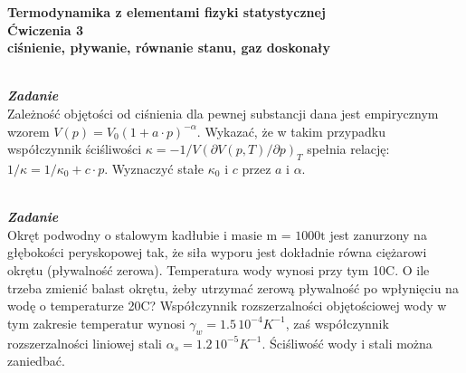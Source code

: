 \documentclass[11pt,a4paper]{article}
\newcounter{zadanie}\newcommand{\zadanie}[1][]{\addtocounter{zadanie}{1} ~\\  {\bf \emph{Zadanie \arabic{zadanie} #1 }} \\}
\begin{document}
\vspace*{-1.8cm}

\begin{centering}
\bf{\Large{Termodynamika z elementami fizyki statystycznej}}\\
Ćwiczenia 3 \\[1mm]
ciśnienie, pływanie, równanie stanu, gaz doskonały \\
\end{centering}

\zadanie
Zależność objętości od ciśnienia dla pewnej substancji dana jest empirycznym wzorem $V(p) = V_0(1 + a\cdot p)^{-\alpha}$.
Wykazać, że w takim przypadku współczynnik ściśliwości $\kappa=-1/V(\partial V(p,T)/\partial p)_T$ spełnia relację: $1/\kappa=1/\kappa_0+c\cdot p$.
Wyznaczyć stałe $\kappa_0$ i $c$ przez $a$ i $\alpha$.

\zadanie
Okręt podwodny o stalowym kadłubie i masie m = $1000\textrm{t}$ jest zanurzony na głębokości peryskopowej tak, że siła wyporu jest dokładnie równa ciężarowi okrętu (pływalność zerowa). Temperatura wody wynosi przy tym 10\degree C. O ile trzeba zmienić balast okrętu, żeby utrzymać zerową pływalność po wpłynięciu na wodę o temperaturze 20\degree C? Współczynnik rozszerzalności objętościowej wody w tym zakresie temperatur wynosi $\gamma_w = 1.5\,10^{-4} K^{-1}$, zaś współczynnik rozszerzalności liniowej stali $\alpha_s = 1.2\,10^{-5} K^{-1}$. Ściśliwość wody i stali można zaniedbać.

\vfill
\end{document}
